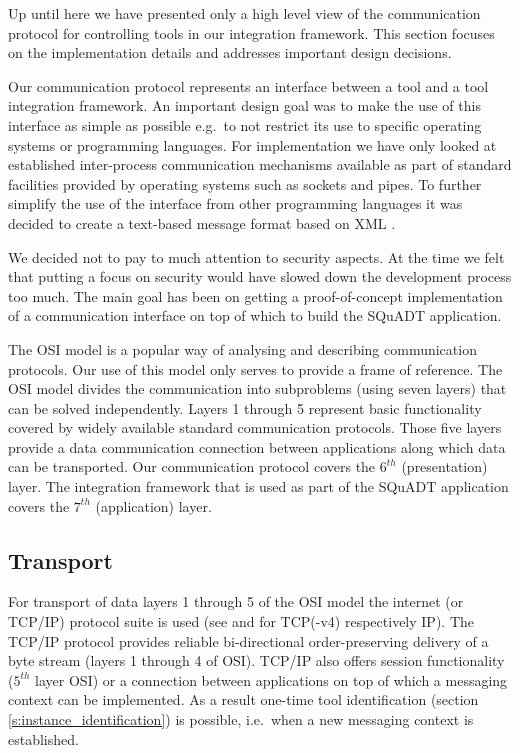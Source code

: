 \documentclass{article}
\newcommand{\squadt}{SQuADT\xspace}
\begin{document}
   Up until here we have presented only a high level view of the communication
   protocol for controlling tools in our integration framework. This section
   focuses on the implementation details and addresses important design
   decisions.
   
   Our communication protocol represents an interface between a tool and a tool
   integration framework. An important design goal was to make the use of this
   interface as simple as possible e.g.\ to not restrict its use to specific
   operating systems or programming languages. For implementation we have only
   looked at established inter-process communication mechanisms available as
   part of standard facilities provided by operating systems such as sockets
   and pipes.  To further simplify the use of the interface from other
   programming languages it was decided to create a text-based message format
   based on XML \cite{XML-1_0-4}.

   We decided not to pay to much attention to security aspects.  At the time we
   felt that putting a focus on security would have slowed down the development
   process too much. The main goal has been on getting a proof-of-concept
   implementation of a communication interface on top of which to build the
   \squadt application.

   The OSI model \cite{Day1983} is a popular way of analysing and describing
   communication protocols. Our use of this model only serves to provide a
   frame of reference. The OSI model divides the communication into subproblems
   (using seven layers) that can be solved independently. Layers 1 through 5
   represent basic functionality covered by widely available standard
   communication protocols. Those five layers provide a data communication
   connection between applications along which data can be transported.  Our
   communication protocol covers the $6^{th}$ (presentation) layer. The
   integration framework that is used as part of the \squadt application covers
   the $7^{th}$ (application) layer.
   
  \subsection{Transport} \label{ss:transport}

   For transport of data layers 1 through 5 of the OSI model the internet (or
   TCP/IP) protocol suite is used (see \cite{rfc793} and \cite{rfc791} for
   TCP(-v4) respectively IP). The TCP/IP protocol provides reliable
   bi-directional order-preserving delivery of a byte stream (layers 1 through
   4 of OSI). TCP/IP also offers session functionality ($5^{th}$ layer OSI) or a
   connection between applications on top of which a messaging context can be
   implemented. As a result one-time tool identification (section
   \ref{s:instance_identification}) is possible, i.e.\ when a new messaging
   context is established. %
\end{document}
